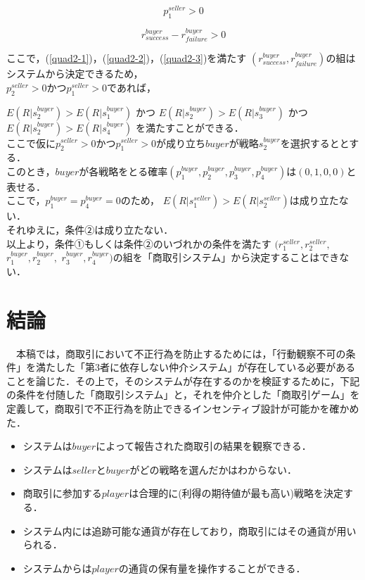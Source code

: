 \documentclass[twocolumn, a4j]{article}
\begin{document}
\begin{equation}
  p^{seller}_1 > 0
\end{equation}

\begin{equation}
  \label{quad2-3}
  r^{buyer}_{success} - r^{buyer}_{failure} > 0
\end{equation}

ここで，(\ref{quad2-1})，(\ref{quad2-2})，(\ref{quad2-3})を満たす
$ (r^{buyer}_{success}, r^{buyer}_{failure})$の組はシステムから決定できるため，\\

$p^{seller}_2>0$かつ$p^{seller}_1>0$であれば，

$E(R|s^{buyer}_2)>E(R|s^{buyer}_1)$
かつ
$E(R|s^{buyer}_2) > E(R|s^{buyer}_3)$
かつ
$E(R|s^{buyer}_2) > E(R|s^{buyer}_4)$
を満たすことができる．\\

ここで仮に$p^{seller}_2>0$かつ$p^{seller}_1>0$が成り立ち$ buyer$が戦略$ s^{buyer}_2$を選択するととする．\\

このとき，$buyer$が各戦略をとる確率$(p^{buyer}_1, p^{buyer}_2, p^{buyer}_3, p^{buyer}_4)$は$ (0, 1, 0, 0)$と表せる．\\

ここで，$ p^{buyer}_1 = p^{buyer}_4 = 0$のため，
$E(R |s^{seller}_1) > E(R |s^{seller}_2)$は成り立たない．\\

それゆえに，条件②は成り立たない．\\

以上より，条件①もしくは条件②のいづれかの条件を満たす
$(r^{seller}_1, r^{seller}_2,$
$r^{buyer}_1,r^{buyer}_2,$
$r^{buyer}_3, r^{buyer}_4)$の組を「商取引システム」から決定することはできない．\\

\twocolumn
\section{結論}
  　本稿では，商取引において不正行為を防止するためには，「行動観察不可の条件」を満たした「第3者に依存しない仲介システム」が存在している必要があることを論じた．その上で，そのシステムが存在するのかを検証するために，下記の条件を付随した「商取引システム」と，それを仲介とした「商取引ゲーム」を定義して，商取引で不正行為を防止できるインセンティブ設計が可能かを確かめた．

  \begin{itemize}
    \item システムは$buyer$によって報告された商取引の結果を観察できる．
    \item システムは$seller$と$buyer$がどの戦略を選んだかはわからない．
    \item 商取引に参加する$player$は合理的に(利得の期待値が最も高い)戦略を決定する．
    \item システム内には追跡可能な通貨が存在しており，商取引にはその通貨が用いられる．
    \item システムからは$player$の通貨の保有量を操作することができる．
  \end{itemize}
\end{document}
